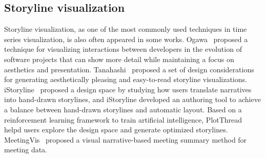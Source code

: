 \subsection{Storyline visualization} %
\noindent Storyline visualization, as one of the most commonly used techniques in time series visualization, is also often appeared in some works. Ogawa~\cite{ogawa_software_2010} proposed a technique for visualizing interactions between developers in the evolution of software projects that can show more detail while maintaining a focus on aesthetics and presentation. Tanahashi~\cite{tanahashi_design_2012} proposed a set of design considerations for generating aesthetically pleasing and easy-to-read storyline visualizations. iStoryline~\cite{tang_istoryline_2018} proposed a design space by studying how users translate narratives into hand-drawn storylines, and iStoryline developed an authoring tool to achieve a balance between hand-drawn storylines and automatic layout. Based on a reinforcement learning framework to train artificial intelligence, PlotThread~\cite{tang_plotthread_2020} helpd users explore the design space and generate optimized storylines. MeetingVis~\cite{shi_meetingvis_2018} proposed a visual narrative-based meeting summary method for meeting data.

